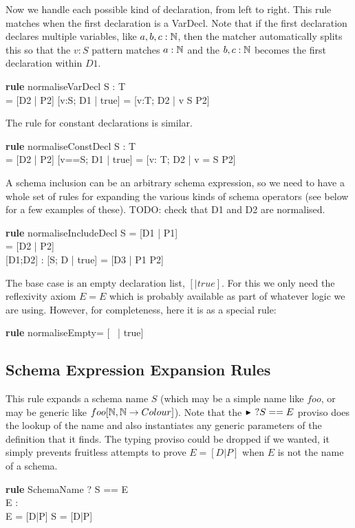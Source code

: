 \documentclass{article}
\newenvironment{zedrule}[1]{\par\textbf{rule }#1\vspace{-2ex}\infrule}{\endinfrule}
\newcommand{\derives}{\derive{}}
\newcommand{\proviso}{\raisebox{0.5ex}{${}_{\blacktriangleright}\ $}}%
\begin{document}
Now we handle each possible kind of declaration, from left to right.
This rule matches when the first declaration is a VarDecl.
Note that if the first declaration declares multiple variables,
like $a,b,c:{\mathbb N}$, then the matcher automatically splits this
so that the $v:S$ pattern matches $a:{\mathbb N}$ and the $b,c:{\mathbb N}$
becomes the first declaration within $D1$.
\begin{zedrule}{normaliseVarDecl}
   \proviso S : \power T \\
   [D1 | true] = [D2 | P2]
\derives
   [v:S; D1 | true] = [v:T; D2 | v \in S \land P2]
\end{zedrule}

The rule for constant declarations is similar.
\begin{zedrule}{normaliseConstDecl}
   \proviso S : T \\
   [D1 | true] = [D2 | P2]
\derives
   [v==S; D1 | true] = [v: T; D2 | v = S \land P2]
\end{zedrule}

A schema inclusion can be an arbitrary schema expression,
so we need to have a whole set of rules for expanding
the various kinds of schema operators (see below for a 
few examples of these).  TODO: check that D1 and D2 are
normalised.
\begin{zedrule}{normaliseIncludeDecl}
   S = [D1 | P1] \\
   [D | true] = [D2 | P2] \\
   \proviso [D1;D2] : \power [D3]
\derives
   [S; D | true] = [D3 | P1 \land P2]
\end{zedrule}

The base case is an empty declaration list, $[|true]$.
For this we only need the reflexivity axiom $E=E$ which
is probably available as part of whatever logic we are
using.  However, for completeness, here it is as a special rule:
\begin{zedrule}{normaliseEmpty}
   [~ | true] = [~ | true]
\end{zedrule}


\subsection{Schema Expression Expansion Rules}

This rule expands a schema name $S$ (which may be
a simple name like $foo$, or may be generic like 
$foo[\nat,\nat \fun Colour]$).  Note that the
$\proviso? S==E$ proviso does the lookup of the
name and also instantiates any generic parameters
of the definition that it finds.  The typing proviso
could be dropped if we wanted, it simply prevents
fruitless attempts to prove $E=[D|P]$ when $E$
is not the name of a schema.
\begin{zedrule}{SchemaName}
  \proviso? S == E \\
  \proviso E : \power [\_] \\
  E = [D|P]
\derives
  S = [D|P]
\end{zedrule}
\end{document}
